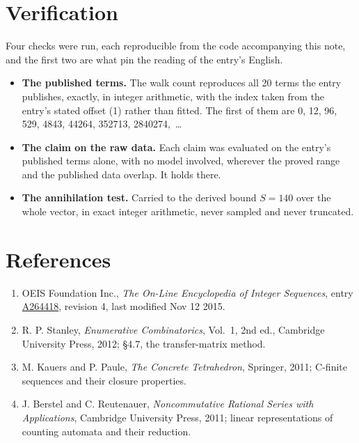 \documentclass[11pt]{article}
\theoremstyle{definition}
\begin{document}
\section{Verification}

Four checks were run, each reproducible from the code accompanying this note, and the first two are what pin the reading of the entry's English.

\begin{itemize}

\item {\bfseries The published terms.} The walk count reproduces all 20 terms the entry publishes, exactly, in integer arithmetic, with the index taken from the entry's stated offset (1) rather than fitted. The first of them are 0, 12, 96, 529, 4843, 44264, 352713, 2840274,~\dots

\item {\bfseries The claim on the raw data.} Each claim was evaluated on the entry's published terms alone, with no model involved, wherever the proved range and the published data overlap. It holds there.

\item {\bfseries The annihilation test.} Carried to the derived bound $S = 140$ over the whole vector, in exact integer arithmetic, never sampled and never truncated.

\end{itemize}

\section{References}

\begin{enumerate}

\item OEIS Foundation Inc., \emph{The On-Line Encyclopedia of Integer Sequences}, entry \href{https://oeis.org/A264418}{A264418}, revision 4, last modified Nov 12 2015.

\item R. P. Stanley, \emph{Enumerative Combinatorics}, Vol.~1, 2nd ed., Cambridge University Press, 2012; \S4.7, the transfer-matrix method.

\item M. Kauers and P. Paule, \emph{The Concrete Tetrahedron}, Springer, 2011; C-finite sequences and their closure properties.

\item J. Berstel and C. Reutenauer, \emph{Noncommutative Rational Series with Applications}, Cambridge University Press, 2011; linear representations of counting automata and their reduction.

\end{enumerate}
\end{document}
